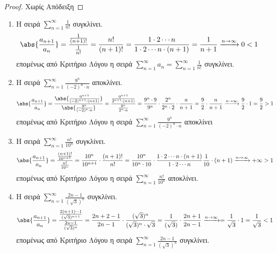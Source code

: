 \documentclass[main.tex]{subfiles}
\begin{document}
\begin{proof}
    Χωρίς Απόδειξη
\end{proof}

\begin{examples}
\item {}
    \begin{enumerate}
        \item Η σειρά $ \sum_{n=1}^{\infty} \frac{1}{n!} $ συγκλίνει.
            \[
                \abs{\frac{a_{n+1}}{a_{n}}} = \frac{\frac{1}{(n+1)!}}{\frac{1}{n!}} = 
                \frac{n!}{(n+1)!} = \frac{1 \cdot 2 \cdots n }{1 \cdot 2 
                \cdots n \cdot(n+1)} = \frac{1}{n+1} \xrightarrow{n \to \infty } 0 < 1 
            \]
            επομένως από Κριτήριο Λόγου η σειρά $ \sum_{n=1}^{\infty} a_{n} = 
            \sum_{n=1}^{\infty} \frac{1}{n!}$ συγκλίνει.

        \item Η σειρά $ \sum_{n=1}^{\infty} \frac{9^{n}}{(-2)^{n}\cdot n} $ αποκλίνει.
            \[
                \abs{\frac{a_{n+1}}{a_{n}}} = \frac{\abs{\frac{9^{n+1}}{(-2)^{n+1}\cdot
                (n+1)}}}{\abs{\frac{9^{n}}{(-2)^{n}\cdot n}}} = 
                \frac{\frac{9^{n+1}}{2^{n+1}\cdot (n+1)}}{\frac{9^{n}}{2^{n}\cdot n}} 
                = \frac{9^{n}\cdot 9}{9^{n}} \cdot \frac{2^{n}}{2^{n}\cdot 2}\cdot 
                \frac{n}{n+1} = \frac{9}{2} \cdot \frac{n}{n+1} \xrightarrow{n \to 
                \infty} \frac{9}{2} \cdot 1 = \frac{9}{2}> 1
            \] 
            επομένως από Κριτήριο Λόγου η σειρά 
            $ \sum_{n=1}^{\infty} \frac{9^{n}}{(-2)^{n}\cdot n} $ αποκλίνει

        \item Η σειρά $ \sum_{n=1}^{\infty} \frac{n!}{10^{n}} $ συγκλίνει.
            \[
                \abs{\frac{a_{n+1}}{a_{n}}} = 
                \frac{\frac{(n+1)!}{10^{n+1}}}{\frac{n!}{10^{n}}} =
                \frac{10^{n}}{10^{n+1}} \cdot \frac{(n+1)!}{n!} = 
                \frac{10^{n}}{10^{n} \cdot 10}
                \cdot \frac{1\cdot 2 \cdots n \cdot (n+1)}{1\cdot 2 \cdots n}  
                \frac{1}{10} \cdot (n+1) \xrightarrow{n \to \infty} + \infty > 1
            \] 
            επομένως από Κριτήριο Λόγου η σειρά 
            $ \sum_{n=1}^{\infty} \frac{n!}{10^{n}} $ αποκλίνει.

        \item Η σειρά $ \sum_{n=1}^{\infty} \frac{2n-1}{(\sqrt{3}) ^{n}} $ συγκλίνει.
            \[
                \abs{\frac{a_{n+1}}{a_{n}}} = \frac{\frac{2(n+1)-1}{(\sqrt{3}
                )^{n+1}}}{\frac{2n-1}{(\sqrt{3} )^{n}}} = \frac{2n+2-1}{2n-1} \cdot 
                \frac{(\sqrt{3} )^{n}}{(\sqrt{3} )^{n}\cdot \sqrt{3}} = 
                \frac{1}{(\sqrt{3})} \cdot \frac{2n+1}{2n-1} 
                \xrightarrow{n \to \infty} = \frac{1}{\sqrt{3}} \cdot 1 =
                \frac{1}{\sqrt{3}} < 1
            \] 
            επομένως από Κριτήριο Λόγου η σειρά 
            $ \sum_{n=1}^{\infty} \frac{2n-1}{(\sqrt{3}) ^{n}} $ συγκλίνει.
    \end{enumerate}
\end{examples}
\end{document}
